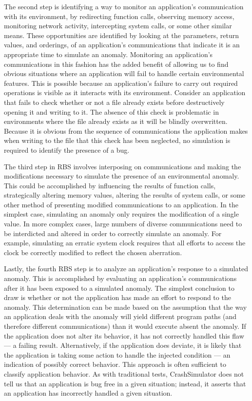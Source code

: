The second step
is identifying
a way to monitor an application's communication
with its environment,
by redirecting function calls,
observing memory access,
monitoring network activity,
intercepting system calls,
or some other similar means.
These opportunities are identified by looking at the parameters,
return values,
and orderings,
of an application's communications
that indicate
it is an appropriate time to simulate an anomaly.
Monitoring an application's communications
in this fashion
has the added benefit
of allowing us to find obvious situations
where an application will fail
to handle certain environmental features.
This is possible because an application's failure
to carry out required operations is visible as it interacts
with its environment.
Consider an application that fails to check whether or not
a file already exists
before destructively opening it and writing to it.
The absence of this check
is problematic in environments where the file already exists
as it will be blindly overwritten.
Because it is obvious from the sequence of communications
the application makes when writing to the file
that this check has been neglected,
no simulation is required to identify the presence of a bug.

The third step in RBS
involves interposing on communications
and making the modifications necessary
to simulate the presence
of an environmental anomaly.
This could be accomplished by
influencing the results of function calls,
strategically altering memory values,
altering the results of system calls,
or some other method
of presenting modified communications to an application.
In the simplest case,
simulating an anomaly only requires
the modification of a single value.
In more complex cases,
large numbers of diverse communications
need to be interdicted and altered
in order to correctly simulate an anomaly.
For example,
simulating an erratic system clock
requires that all efforts
to access the clock
be correctly modified
to reflect the chosen aberration.

Lastly, the fourth RBS step
is to analyze an application's response
to a simulated anomaly.
This is accomplished by evaluating an application's
communications after it has been exposed
to a simulated anomaly.
The simplest conclusion to draw
is whether or not the application
has made an effort to respond
to the anomaly.
This determination can be made based
on the assumption that the way an
application deals with the anomaly will yield
different program paths (and therefore different communications) than
it would execute absent the anomaly.
If the application
does not alter its behavior, it has not
correctly handled this flaw --- a failing result.
Alternatively,
if the application does deviate,
it is likely that the application is taking some
action to handle the injected condition --- an indication of possibly
correct behavior.
This approach is often sufficient
to classify application behavior.
As with traditional tests,
CrashSimulator does not tell us that an application
is bug free in a given situation;
instead,
it asserts that an application
has incorrectly handled a given situation.

